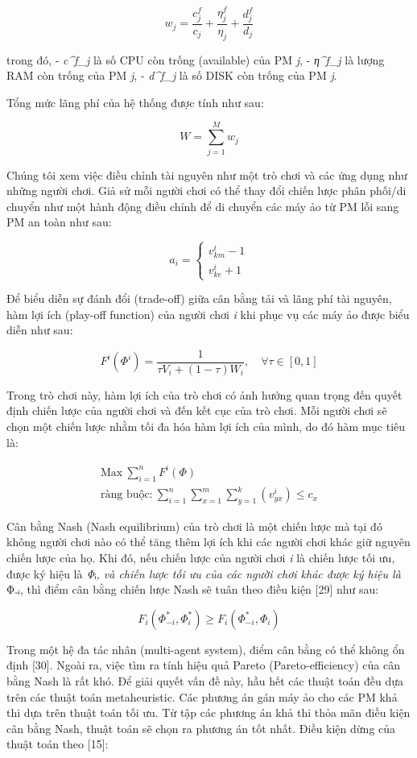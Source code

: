 \documentclass[
  vietnamese,
]{article}
\begin{document}
\[w_j = \frac{c^f_j}{c_j} + \frac{\eta^f_j}{\eta_j} + \frac{d^f_j}{d_j} \tag{13}\]

trong đó, - \emph{c\^{}f\_j} là số CPU còn trống (available) của PM
\emph{j}, - \emph{η\^{}f\_j} là lượng RAM còn trống của PM \emph{j}, -
\emph{d\^{}f\_j} là số DISK còn trống của PM \emph{j}.

Tổng mức lãng phí của hệ thống được tính như sau:

\[W = \sum_{j=1}^{M} w_j \tag{14}\]

Chúng tôi xem việc điều chỉnh tài nguyên như một trò chơi và các ứng
dụng như những người chơi. Giả sử mỗi người chơi có thể thay đổi chiến
lược phân phối/di chuyển như một hành động điều chỉnh để di chuyển các
máy ảo từ PM lỗi sang PM an toàn như sau:

\[a_i = \begin{cases} v^i_{km} - 1 \\ v^i_{ke} + 1 \end{cases} \tag{15}\]

Để biểu diễn sự đánh đổi (trade-off) giữa cân bằng tải và lãng phí tài
nguyên, hàm lợi ích (play-off function) của người chơi \emph{i} khi phục
vụ các máy ảo được biểu diễn như sau:

\[F^i(\Phi^i) = \frac{1}{\tau V_i + (1-\tau) W_i}, \quad \forall \tau \in [0,1] \tag{16}\]

Trong trò chơi này, hàm lợi ích của trò chơi có ảnh hưởng quan trọng đến
quyết định chiến lược của người chơi và đến kết cục của trò chơi. Mỗi
người chơi sẽ chọn một chiến lược nhằm tối đa hóa hàm lợi ích của mình,
do đó hàm mục tiêu là:

\[\begin{aligned}\text{Max}\ \sum_{i=1}^{n} F^i(\Phi) \\ \text{ràng buộc:}\ \sum_{i=1}^{n} \sum_{x=1}^{m} \sum_{y=1}^{k} (v^i_{yx}) \le c_x\end{aligned} \tag{17}\]

Cân bằng Nash (Nash equilibrium) của trò chơi là một chiến lược mà tại
đó không người chơi nào có thể tăng thêm lợi ích khi các người chơi khác
giữ nguyên chiến lược của họ. Khi đó, nếu chiến lược của người chơi
\emph{i} là chiến lược tối ưu, được ký hiệu là \emph{Φ}ᵢ\emph{, và chiến
lược tối ưu của các người chơi khác được ký hiệu là }Φ\emph{₋ᵢ}, thì
điểm cân bằng chiến lược Nash sẽ tuân theo điều kiện {[}29{]} như sau:

\[F_i(\Phi^*_{-i}, \Phi^*_i) \ge F_i(\Phi^*_{-i}, \Phi_i) \tag{18}\]

Trong một hệ đa tác nhân (multi-agent system), điểm cân bằng có thể
không ổn định {[}30{]}. Ngoài ra, việc tìm ra tính hiệu quả Pareto
(Pareto-efficiency) của cân bằng Nash là rất khó. Để giải quyết vấn đề
này, hầu hết các thuật toán đều dựa trên các thuật toán metaheuristic.
Các phương án gán máy ảo cho các PM khả thi dựa trên thuật toán tối ưu.
Từ tập các phương án khả thi thỏa mãn điều kiện cân bằng Nash, thuật
toán sẽ chọn ra phương án tốt nhất. Điều kiện dừng của thuật toán theo
{[}15{]}:
\end{document}
